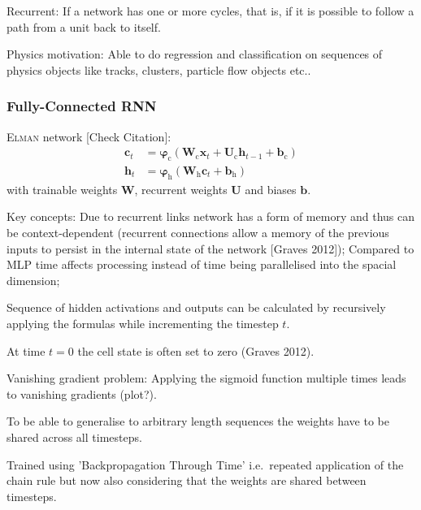 Recurrent: If a network has one or more cycles, that is, if it is possible to
follow a path from a unit back to itself.

Physics motivation: Able to do regression and classification on sequences of
physics objects like tracks, clusters, particle flow objects etc..

\subsubsection{Fully-Connected RNN}
\label{sec:fully_connected_rnn}


\textsc{Elman} network [Check Citation]\cite{elman, graves}:
\begin{align*}
  \mathbf{c}_t &= \bm{\varphi}_{\text{c}}\left( \mathbf{W}_{\text{c}} \mathbf{x}_{t} + \mathbf{U}_{\text{c}} \mathbf{h}_{t-1} + \mathbf{b}_{\text{c}} \right) \\
  \mathbf{h}_t &= \bm{\varphi}_{\text{h}}\left( \mathbf{W}_{\text{h}} \mathbf{c}_{t} + \mathbf{b}_{\text{h}} \right)
\end{align*}
 with
trainable weights $\mathbf{W}$, recurrent weights $\mathbf{U}$ and biases
$\mathbf{b}$.

Key concepts: Due to recurrent links network has a form of memory and thus can
be context-dependent (recurrent connections allow a memory of the previous
inputs to persist in the internal state of the network [Graves
2012]\cite{graves}); Compared to MLP time affects processing instead of time
being parallelised into the spacial dimension;

Sequence of hidden activations and outputs can be calculated by recursively
applying the formulas while incrementing the timestep $t$.

At time $t=0$ the cell state is often set to zero (Graves 2012).

Vanishing gradient problem: Applying the sigmoid function multiple times leads
to vanishing gradients (plot?).

To be able to generalise to arbitrary length sequences the weights have to be
shared across all timesteps.

Trained using 'Backpropagation Through Time' i.e.\ repeated application of the
chain rule but now also considering that the weights are shared between
timesteps.

